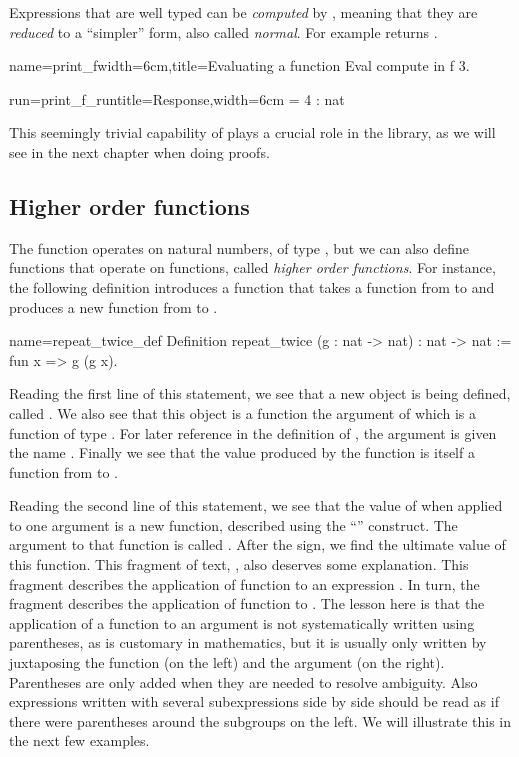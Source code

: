 Expressions that are well typed can be \emph{computed} by \Coq{},
meaning that they are \emph{reduced} to a ``simpler'' form, also
called \emph{normal}.
For example  returns .

\begin{coq}{name=print_f}{width=6cm,title=Evaluating a function}
Eval compute in f 3.
\end{coq}
\begin{coqout}{run=print_f_run}{title=Response,width=6cm}
 = 4 : nat
\end{coqout}
This seemingly trivial capability of \Coq{} plays a crucial role
in the \mcbMC{} library, as we will see in the next chapter when
doing proofs.

\subsection{Higher order functions}

The function  operates on natural numbers, of type , but
we can also define functions that operate on functions, called
\emph{higher order functions}.  For instance,
the following definition introduces a function that takes a function
from  to  and produces a new function from  to
.

\begin{coq}{name=repeat_twice_def}{}
Definition repeat_twice (g : nat -> nat) : nat -> nat :=
  fun x => g (g x).
\end{coq}
Reading the first line of this statement, we see that a new object is
being defined, called .  We also see that this object
is a function the argument of which is a function of
type .  For later reference in the definition of
, the argument is given the name .  Finally
we see that the value produced by the function 
is itself a function from  to .

Reading the second line of this statement, we see that the value
of  when applied to one argument is a new
function, described using the ``'' construct.  The
argument to that function is called .  After the \C{=>} sign, we
find the ultimate value of this function.  This fragment of text, , also deserves some explanation.  This fragment describes the
application of function  to an expression .  In turn,
the fragment  describes the application of function  to
.  The lesson here is that the application of a function to an
argument is not systematically written using parentheses, as is
customary in mathematics, but it is usually only written by
juxtaposing the function (on the left) and the argument (on the
right).  Parentheses are only added when they are needed to resolve
ambiguity.  Also expressions written with several subexpressions side
by side should be read as if there were parentheses around the
subgroups on the left.  We will illustrate this in the next few
examples.


